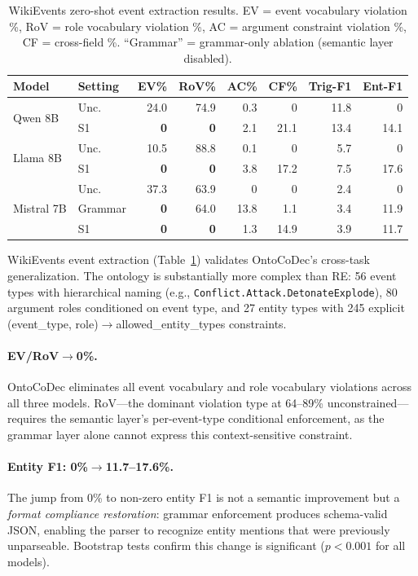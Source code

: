 \documentclass[11pt]{article}
\newcommand{\sys}{OntoCoDec}
\begin{document}
\begin{table}[t]
\centering
\caption{WikiEvents zero-shot event extraction results. EV = event vocabulary violation \%, RoV = role vocabulary violation \%, AC = argument constraint violation \%, CF = cross-field \%. ``Grammar'' = grammar-only ablation (semantic layer disabled).}
\label{tab:ee_zs}
\small
\begin{tabular}{ll rrrr rr}
\toprule
\textbf{Model} & \textbf{Setting} & \textbf{EV\%} & \textbf{RoV\%} & \textbf{AC\%} & \textbf{CF\%} & \textbf{Trig-F1} & \textbf{Ent-F1} \\
\midrule
\multirow{2}{*}{Qwen 8B}
 & Unc. & 24.0 & 74.9 & 0.3 & 0 & 11.8 & 0 \\
 & S1 & \textbf{0} & \textbf{0} & 2.1 & 21.1 & 13.4 & 14.1 \\
\midrule
\multirow{2}{*}{Llama 8B}
 & Unc. & 10.5 & 88.8 & 0.1 & 0 & 5.7 & 0 \\
 & S1 & \textbf{0} & \textbf{0} & 3.8 & 17.2 & 7.5 & 17.6 \\
\midrule
\multirow{3}{*}{Mistral 7B}
 & Unc. & 37.3 & 63.9 & 0 & 0 & 2.4 & 0 \\
 & Grammar & \textbf{0} & 64.0 & 13.8 & 1.1 & 3.4 & 11.9 \\
 & S1 & \textbf{0} & \textbf{0} & 1.3 & 14.9 & 3.9 & 11.7 \\
\bottomrule
\end{tabular}
\end{table}

WikiEvents event extraction (Table~\ref{tab:ee_zs}) validates \sys{}'s cross-task generalization.
The ontology is substantially more complex than RE: 56 event types with hierarchical naming (e.g., \texttt{Conflict.Attack.DetonateExplode}), 80 argument roles conditioned on event type, and 27 entity types with 245 explicit (event\_type, role)$\to$allowed\_entity\_types constraints.

\paragraph{EV/RoV$\to$0\%.}
\sys{} eliminates all event vocabulary and role vocabulary violations across all three models.
RoV---the dominant violation type at 64--89\% unconstrained---requires the semantic layer's per-event-type conditional enforcement, as the grammar layer alone cannot express this context-sensitive constraint.

\paragraph{Entity F1: 0\%$\to$11.7--17.6\%.}
The jump from 0\% to non-zero entity F1 is not a semantic improvement but a \emph{format compliance restoration}: grammar enforcement produces schema-valid JSON, enabling the parser to recognize entity mentions that were previously unparseable.
Bootstrap tests confirm this change is significant ($p<0.001$ for all models).
\end{document}
